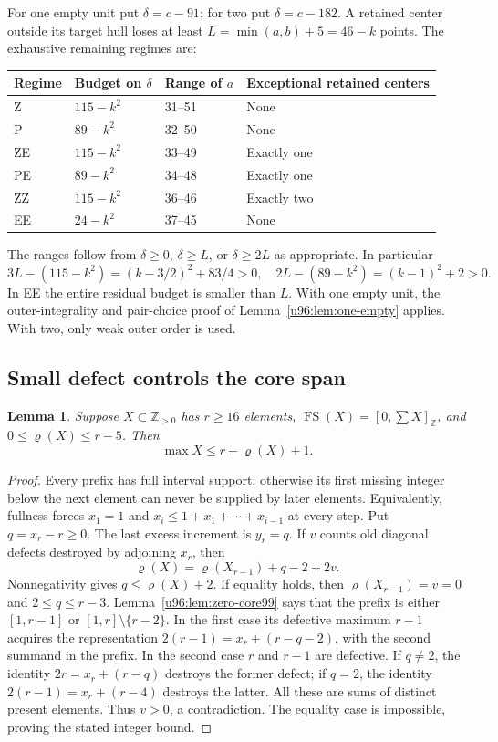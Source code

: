 \documentclass[11pt,a4paper]{article}
\newtheorem{lemma}[theorem]{Lemma}
\theoremstyle{remark}
\newcommand{\FS}{\operatorname{FS}}
\newcommand{\rhoD}{\varrho}
\begin{document}
For one empty unit put $\delta=c-91$; for two put $\delta=c-182$.
A retained center outside its target hull loses at least
$L=\min(a,b)+5=46-k$ points. The exhaustive remaining regimes are:
\begin{center}\small
\begin{tabular}{llll}
\toprule
Regime&Budget on $\delta$&Range of $a$&Exceptional retained centers\\
\midrule
Z&$115-k^2$&31--51&None\\
P&$89-k^2$&32--50&None\\
ZE&$115-k^2$&33--49&Exactly one\\
PE&$89-k^2$&34--48&Exactly one\\
ZZ&$115-k^2$&36--46&Exactly two\\
EE&$24-k^2$&37--45&None\\
\bottomrule
\end{tabular}
\end{center}
The ranges follow from $\delta\geq0$, $\delta\geq L$, or
$\delta\geq2L$ as appropriate. In particular
\[
 3L-(115-k^2)=(k-3/2)^2+83/4>0,
 \quad 2L-(89-k^2)=(k-1)^2+2>0.
\]
In EE the entire residual budget is smaller than $L$.
With one empty unit, the outer-integrality and pair-choice proof of
Lemma~\ref{u96:lem:one-empty} applies. With two, only weak outer order is used.

\subsection{Small defect controls the core span}
\begin{lemma}\label{u96:lem:span98}
Suppose $X\subset\mathbb Z_{>0}$ has $r\geq16$ elements,
$\FS(X)=[0,\sum X]_{\mathbb Z}$, and
$0\leq\rhoD(X)\leq r-5$. Then
\[
 \max X\leq r+\rhoD(X)+1.
\]
\end{lemma}
\begin{proof}
Every prefix has full interval support: otherwise its first missing
integer below the next element can never be supplied by later elements.
Equivalently, fullness forces $x_1=1$ and
$x_i\leq1+x_1+\cdots+x_{i-1}$ at every step.
Put $q=x_r-r\geq0$. The last excess increment is $y_r=q$.
If $v$ counts old diagonal defects destroyed by adjoining $x_r$, then
\[
 \rhoD(X)=\rhoD(X_{r-1})+q-2+2v.
\]
Nonnegativity gives $q\leq\rhoD(X)+2$. If equality holds, then
$\rhoD(X_{r-1})=v=0$ and $2\leq q\leq r-3$.
Lemma~\ref{u96:lem:zero-core99} says that the prefix is either $[1,r-1]$ or
$[1,r]\setminus\{r-2\}$.
In the first case its defective maximum $r-1$ acquires the representation
$2(r-1)=x_r+(r-q-2)$, with the second summand in the prefix.
In the second case $r$ and $r-1$ are defective. If $q\ne2$, the identity
$2r=x_r+(r-q)$ destroys the former defect; if $q=2$, the identity
$2(r-1)=x_r+(r-4)$ destroys the latter. All these are sums of distinct
present elements. Thus $v>0$, a contradiction. The equality case is
impossible, proving the stated integer bound.
\end{proof}
\end{document}
